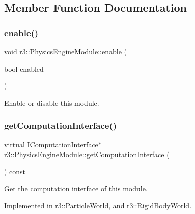 \subsection{Member Function Documentation}
\mbox{\label{classr3_1_1_physics_engine_module_abaaace8d25ea23ed21ade61ca2b201d0}} 
\subsubsection{\texorpdfstring{enable()}{enable()}}
{\footnotesize\ttfamily void r3\+::\+Physics\+Engine\+Module\+::enable (\begin{DoxyParamCaption}\item[{bool}]{enabled }\end{DoxyParamCaption})}

Enable or disable this module. \mbox{\label{classr3_1_1_physics_engine_module_a3b1d0d9bea0a82534f367f6d728312d3}} 
\subsubsection{\texorpdfstring{get\+Computation\+Interface()}{getComputationInterface()}}
{\footnotesize\ttfamily virtual \mbox{\hyperlink{classr3_1_1_i_computation_interface}{I\+Computation\+Interface}}$\ast$ r3\+::\+Physics\+Engine\+Module\+::get\+Computation\+Interface (\begin{DoxyParamCaption}{ }\end{DoxyParamCaption}) const\hspace{0.3cm}{\ttfamily [pure virtual]}}

Get the computation interface of this module. 

Implemented in \mbox{\hyperlink{classr3_1_1_particle_world_a1e806bf89ec6445a54b9534f1efc081f}{r3\+::\+Particle\+World}}, and \mbox{\hyperlink{classr3_1_1_rigid_body_world_ac25b39a5b15666d99f42b68f29f8a97b}{r3\+::\+Rigid\+Body\+World}}.

\mbox{\label{classr3_1_1_physics_engine_module_add8b93ca3e3e3ec0ff045c15610119ea}} 
